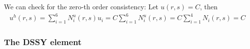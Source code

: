 We can check for the zero-th order consistency: Let $u(r,s)=C$, then 
\begin{eqnarray}
u^h(r,s) 
= \sum_{i=1}^6 N_i^u(r,s) u_i 
= C \sum_{i=1}^6 N_i^u(r,s) 
= C \sum_{i=1}^4 N_i(r,s)  
= C
\end{eqnarray}



\newpage
\subsubsection{The DSSY element} \label{ss:dssy_2D}













